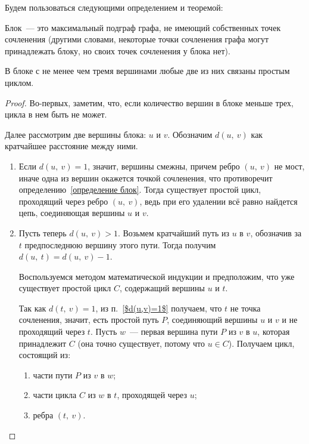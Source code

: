 \begin{solution}

Будем пользоваться следующими определением и теоремой:

\begin{definition}\label{определение блок}
Блок~--- это максимальный подграф графа, не имеющий собственных точек сочленения (другими словами, некоторые точки сочленения графа могут принадлежать блоку, но своих точек сочленения у блока нет).
\end{definition}

\begin{theorem}\label{теорема цикл вершин блока}
В блоке с не менее чем тремя вершинами любые две из них связаны простым циклом.
\end{theorem}
\begin{proof}
Во-первых, заметим, что, если количество вершин в блоке меньше трех, цикла в нем быть не может.

Далее рассмотрим две вершины блока: $u$ и $v$. Обозначим $d(u,~v)$ как кратчайшее расстояние между ними.
\begin{enumerate}
    \item \label{$d(u,v)=1$} Если $d(u,~v) = 1$, значит, вершины смежны, причем ребро $(u,~v)$ не мост, иначе одна из вершин окажется точкой сочленения, что противоречит определению~\ref{определение блок}. Тогда существует простой цикл, проходящий через ребро $(u,~v)$, ведь при его удалении всё равно найдется цепь, соединяющая вершины $u$ и $v$.
    \item Пусть теперь $d(u,~v) > 1$. Возьмем кратчайший путь из $u$ в $v$, обозначив за $t$ предпоследнюю вершину этого пути. Тогда получим $d(u,~t) = d(u,~v) - 1$.
    
    Воспользуемся методом математической индукции и предположим, что уже существует простой цикл $C$, содержащий вершины $u$ и $t$.
    
    Так как $d(t,~v) = 1$, из п.~\ref{$d(u,v)=1$} получаем, что $t$ не точка сочленения, значит, есть простой путь $P$, соединяющий вершины $u$ и $v$ и не проходящий через $t$. Пусть $w$~--- первая вершина пути $P$ из $v$ в $u$, которая принадлежит $C$ (она точно существует, потому что $u \in C$). Получаем цикл, состоящий из:
    \begin{enumerate}
        \item части пути $P$ из $v$ в $w$;
        \item части цикла $C$ из $w$ в $t$, проходящей через $u$;
        \item ребра $(t,~v)$.
    \end{enumerate}
\end{enumerate}


\end{proof}
\end{solution}
